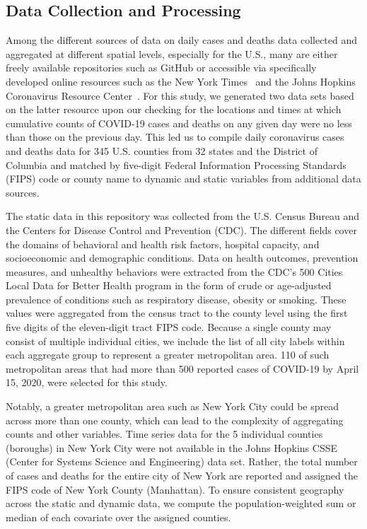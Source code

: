 \documentclass[letterpaper, inpress]{jds} %
\renewcommand{\_}{%
    \textunderscore\hspace{0pt}%
}
\begin{document}
\subsection{Data Collection and Processing}

Among the different sources of data on daily cases and deaths data
collected and aggregated at different spatial levels, especially for
the U.S., many are either freely available repositories such as GitHub
or accessible via specifically developed online resources such as the
New York Times~\citep{github-nytimes} and the Johns Hopkins
Coronavirus Resource Center~\citep{www-jh-covid19}.  For this study,
we generated two data sets based on the latter resource upon our
checking for the locations and times at which cumulative counts of
COVID-19 cases and deaths on any given day were no less than those on
the previous day. This led us to compile daily coronavirus cases and
deaths data for 345 U.S. counties from 32 states and the District of
Columbia and matched by five-digit Federal Information Processing
Standards (FIPS) code or county name to dynamic and static variables
from additional data sources.

The static data in this repository was collected from the U.S. Census
Bureau and the Centers for Disease Control and Prevention (CDC). The
different fields cover the domains of behavioral and health risk
factors, hospital capacity, and socioeconomic and demographic
conditions. Data on health outcomes, prevention measures, and
unhealthy behaviors were extracted from the CDC's 500 Cities Local
Data for Better Health program \citep{www-cdc-chronic-data} in the form
of crude or age-adjusted prevalence of conditions such as respiratory
disease, obesity or smoking. These values were aggregated from the
census tract to the county level using the first five digits of the
eleven-digit tract FIPS code. Because a single county may consist of
multiple individual cities, we include the list of all city labels
within each aggregate group to represent a greater metropolitan
area. 110 of such metropolitan areas that had more than 500 reported
cases of COVID-19 by April 15, 2020, were selected for this study.

Notably, a greater metropolitan area such as New York City could be
spread across more than one county, which can lead to the complexity
of aggregating counts and other variables. Time series data for the 5
individual counties (boroughs) in New York City were not available in
the Johns Hopkins CSSE (Center for Systems Science and Engineering)
data set. Rather, the total number of cases and deaths for the entire
city of New York are reported and assigned the FIPS code of New York
County (Manhattan). To ensure consistent geography across the static
and dynamic data, we compute the population-weighted sum or median of
each covariate over the assigned counties.
\end{document}
